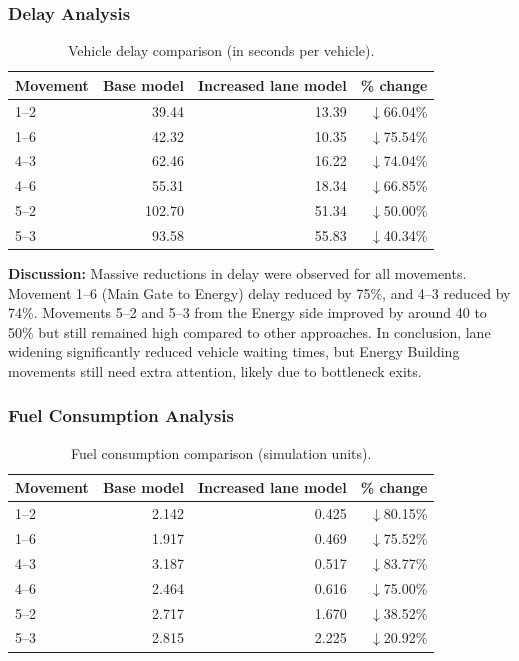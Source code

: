 \documentclass[11pt]{article}
\begin{document}
\subsubsection{Delay Analysis}
\begin{table}[H]
  \centering
  \small
  \caption{Vehicle delay comparison (in seconds per vehicle).}
  \begin{tabular}{@{}lrrr@{}}
    \toprule
    \textbf{Movement} & \textbf{Base model} & \textbf{Increased lane model} & \textbf{\% change} \\
    \midrule
    1--2 & 39.44  & 13.39 & $\downarrow$66.04\% \\
    1--6 & 42.32  & 10.35 & $\downarrow$75.54\% \\
    4--3 & 62.46  & 16.22 & $\downarrow$74.04\% \\
    4--6 & 55.31  & 18.34 & $\downarrow$66.85\% \\
    5--2 & 102.70 & 51.34 & $\downarrow$50.00\% \\
    5--3 & 93.58  & 55.83 & $\downarrow$40.34\% \\
    \bottomrule
  \end{tabular}
\end{table}

\textbf{Discussion:} Massive reductions in delay were observed for all movements. Movement 1--6 (Main
Gate to Energy) delay reduced by 75\%, and 4--3 reduced by 74\%. Movements 5--2 and 5--3 from the Energy
side improved by around 40 to 50\% but still remained high compared to other approaches. In conclusion,
lane widening significantly reduced vehicle waiting times, but Energy Building movements still need
extra attention, likely due to bottleneck exits.

\subsubsection{Fuel Consumption Analysis}
\begin{table}[H]
  \centering
  \small
  \caption{Fuel consumption comparison (simulation units).}
  \begin{tabular}{@{}lrrr@{}}
    \toprule
    \textbf{Movement} & \textbf{Base model} & \textbf{Increased lane model} & \textbf{\% change} \\
    \midrule
    1--2 & 2.142 & 0.425 & $\downarrow$80.15\% \\
    1--6 & 1.917 & 0.469 & $\downarrow$75.52\% \\
    4--3 & 3.187 & 0.517 & $\downarrow$83.77\% \\
    4--6 & 2.464 & 0.616 & $\downarrow$75.00\% \\
    5--2 & 2.717 & 1.670 & $\downarrow$38.52\% \\
    5--3 & 2.815 & 2.225 & $\downarrow$20.92\% \\
    \bottomrule
  \end{tabular}
\end{table}
\end{document}
